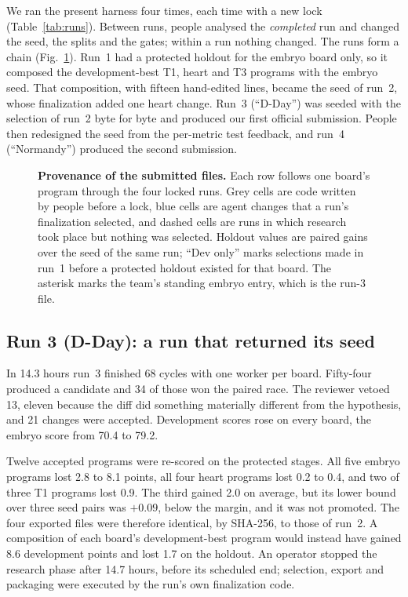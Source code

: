 \documentclass[9pt,twocolumn,a4paper]{extarticle}
\begin{document}
We ran the present harness four times, each time with a new lock (Table~\ref{tab:runs}). Between runs, people
analysed the \emph{completed} run and changed the seed, the splits and the gates; within a run nothing changed. The
runs form a chain (Fig.~\ref{fig:lineage}). Run~1 had a protected holdout for the embryo board only, so it composed
the development-best T1, heart and T3 programs with the embryo seed. That composition, with fifteen hand-edited
lines, became the seed of run~2, whose finalization added one heart change. Run~3 (``D-Day'') was seeded with the
selection of run~2 byte for byte and produced our first official submission. People then redesigned the seed from the
per-metric test feedback, and run~4 (``Normandy'') produced the second submission.

\begin{figure}[t] \centering \resizebox{\textwidth}{!}{} \caption{\textbf{Provenance of the submitted files.} Each row follows one board's program through the four locked runs. Grey cells are code written by people before a lock, blue cells are agent changes that a run's finalization selected, and dashed cells are runs in which research took place but nothing was selected. Holdout values are paired gains over the seed of the same run; ``Dev only'' marks selections made in run~1 before a protected holdout existed for that board. The asterisk marks the team's standing embryo entry, which is the run-3 file.} \label{fig:lineage} \end{figure}

\subsection{Run 3 (D-Day): a run that returned its seed}
\label{sec:dday}

In 14.3 hours run~3 finished 68 cycles with one worker per board. Fifty-four produced a candidate and 34 of those won the paired race. The reviewer vetoed 13, eleven because the diff did something materially different from the hypothesis, and 21 changes were accepted. Development scores rose on every board, the embryo score from 70.4 to 79.2.

Twelve accepted programs were re-scored on the protected stages. All five embryo programs lost 2.8 to 8.1 points,
all four heart programs lost 0.2 to 0.4, and two of three T1 programs lost 0.9. The third gained 2.0 on average, but
its lower bound over three seed pairs was $+0.09$, below the margin, and it was not promoted. The four exported files
were therefore identical, by SHA-256, to those of run~2. A composition of each board's development-best program
would instead have gained 8.6 development points and lost 1.7 on the holdout. An operator stopped the research phase
after 14.7 hours, before its scheduled end; selection, export and packaging were executed by the run's own
finalization code.
\end{document}
